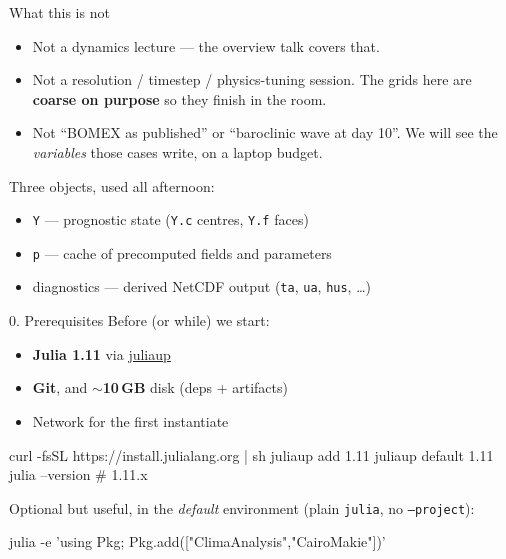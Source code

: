 \documentclass[aspectratio=169,11pt]{beamer}
\newcommand{\cta}[1]{{\color{climateal}\textbf{#1}}}
\begin{document}
\begin{frame}{What this is not}
\begin{itemize}
  \item Not a dynamics lecture --- the overview talk covers that.
  \item Not a resolution / timestep / physics-tuning session.
    The grids here are \cta{coarse on purpose} so they finish in the room.
  \item Not ``BOMEX as published'' or ``baroclinic wave at day 10''.
    We will see the \emph{variables} those cases write, on a laptop budget.
\end{itemize}
\vspace{0.8em}
Three objects, used all afternoon:
\begin{itemize}
  \item \texttt{Y} --- prognostic state (\texttt{Y.c} centres, \texttt{Y.f} faces)
  \item \texttt{p} --- cache of precomputed fields and parameters
  \item diagnostics --- derived NetCDF output (\texttt{ta}, \texttt{ua}, \texttt{hus}, \ldots)
\end{itemize}
\end{frame}

\begin{frame}[fragile]{0. Prerequisites}
Before (or while) we start:
\begin{itemize}
  \item \textbf{Julia 1.11} via \href{https://julialang.org/install/}{juliaup}
  \item \textbf{Git}, and \textbf{$\sim$10\,GB} disk (deps + artifacts)
  \item Network for the first instantiate
\end{itemize}
\vspace{0.4em}
\begin{semiverbatim}
curl -fsSL https://install.julialang.org | sh
juliaup add 1.11
juliaup default 1.11
julia --version          # 1.11.x
\end{semiverbatim}
\vspace{0.4em}
\small
Optional but useful, in the \emph{default} environment (plain \texttt{julia},
no \texttt{--project}):
\begin{semiverbatim}
julia -e 'using Pkg; Pkg.add(["ClimaAnalysis","CairoMakie"])'
\end{semiverbatim}
\end{frame}
\end{document}
